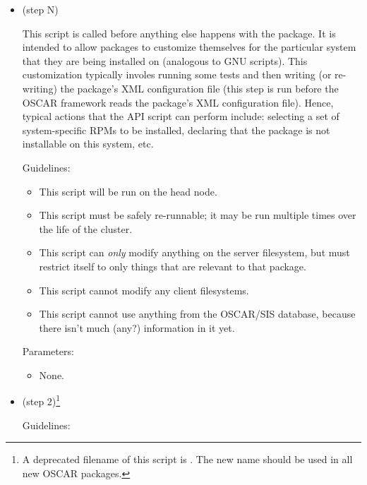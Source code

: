 \begin{itemize}

\begchange

\item {} (step N)
  
  This script is called before anything else happens with the package.
  It is intended to allow packages to customize themselves for the
  particular system that they are being installed on (analogous to GNU
   scripts).  This customization typically involes
  running some tests and then writing (or re-writing) the package's
  XML configuration file (this step is run before the OSCAR framework
  reads the package's XML configuration file).  Hence, typical actions
  that the  API script can perform include: selecting a set
  of system-specific RPMs to be installed, declaring that the package
  is not installable on this system, etc.

  Guidelines:

  \begin{itemize}
  \item This script will be run on the head node.
  \item This script must be safely re-runnable; it may be run multiple
    times over the life of the cluster.
  \item This script can {\em only} modify anything on the server
    filesystem, but must restrict itself to only things that are
    relevant to that package.
  \item This script cannot modify any client filesystems.
  \item This script cannot use anything from the OSCAR/SIS database,
    because there isn't much (any?) information in it yet.
  \end{itemize}

  Parameters:
  
  \begin{itemize}
  \item None.
  \end{itemize}

\endchange
  
\item {} (step 2)\footnote{A deprecated
    filename of this script is .  The
    new name  should be used in all
    new OSCAR packages.}
  
  Guidelines:


\end{itemize}
